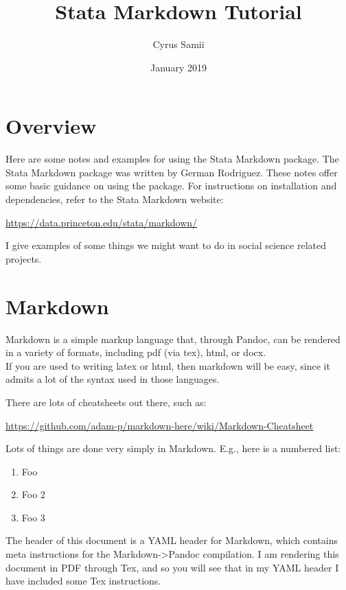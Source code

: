 \documentclass[]{article}
\title{Stata Markdown Tutorial}
\author{Cyrus Samii}
\date{January 2019}
\providecommand{\tightlist}{%
  \setlength{\itemsep}{0pt}\setlength{\parskip}{0pt}}
\begin{document}
\maketitle

\hypertarget{overview}{%
\section{Overview}\label{overview}}

Here are some notes and examples for using the Stata Markdown package.
The Stata Markdown package was written by German Rodriguez. These notes
offer some basic guidance on using the package. For instructions on
installation and dependencies, refer to the Stata Markdown website:

\url{https://data.princeton.edu/stata/markdown/}

I give examples of some things we might want to do in social science
related projects.

\hypertarget{markdown}{%
\section{Markdown}\label{markdown}}

Markdown is a simple markup language that, through Pandoc, can be
rendered in a variety of formats, including pdf (via tex), html, or
docx.\\
If you are used to writing latex or html, then markdown will be easy,
since it admits a lot of the syntax used in those languages.

There are lots of cheatsheets out there, such as:

\url{https://github.com/adam-p/markdown-here/wiki/Markdown-Cheatsheet}

Lots of things are done very simply in Markdown. E.g., here is a
numbered list:

\begin{enumerate}
\def\labelenumi{\arabic{enumi}.}
\tightlist
\item
  Foo
\item
  Foo 2
\item
  Foo 3
\end{enumerate}

The header of this document is a YAML header for Markdown, which
contains meta instructions for the Markdown-\textgreater{}Pandoc
compilation. I am rendering this document in PDF through Tex, and so you
will see that in my YAML header I have included some Tex instructions.
\end{document}
